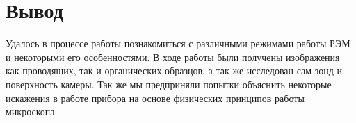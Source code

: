 \documentclass[a4paper, 12pt]{article}
\begin{document}
	\section{Вывод}
	Удалось в процессе работы познакомиться с различными режимами работы РЭМ и некоторыми его особенностями. В ходе работы были получены изображения как проводящих, так и органических образцов, а так же исследован сам зонд и поверхность камеры. Так же мы предприняли попытки объяснить некоторые искажения в работе прибора на основе физических принципов работы микроскопа.
\end{document}
